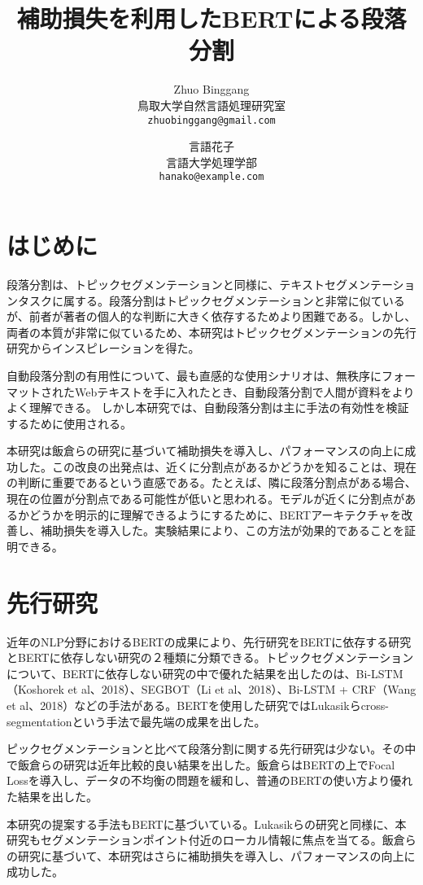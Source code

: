 \documentclass[
  platex, dvipdfmx,  %
]{nlp2021}
\title{補助損失を利用したBERTによる段落分割}
\author{%
  Zhuo Binggang \\ 鳥取大学自然言語処理研究室 \\ \texttt{zhuobinggang@gmail.com}\and
  言語花子 \\ 言語大学処理学部 \\ \texttt{hanako@example.com}}
\begin{document}
\maketitle

\section{はじめに}
段落分割は、トピックセグメンテーションと同様に、テキストセグメンテーションタスクに属する。段落分割はトピックセグメンテーションと非常に似ているが、前者が著者の個人的な判断に大きく依存するためより困難である。しかし、両者の本質が非常に似ているため、本研究はトピックセグメンテーションの先行研究からインスピレーションを得た。

自動段落分割の有用性について、最も直感的な使用シナリオは、無秩序にフォーマットされたWebテキストを手に入れたとき、自動段落分割で人間が資料をよりよく理解できる。 しかし本研究では、自動段落分割は主に手法の有効性を検証するために使用される。

本研究は飯倉らの研究に基づいて補助損失を導入し、パフォーマンスの向上に成功した。この改良の出発点は、近くに分割点があるかどうかを知ることは、現在の判断に重要であるという直感である。たとえば、隣に段落分割点がある場合、現在の位置が分割点である可能性が低いと思われる。モデルが近くに分割点があるかどうかを明示的に理解できるようにするために、BERTアーキテクチャを改善し、補助損失を導入した。実験結果により、この方法が効果的であることを証明できる。

\section{先行研究}

近年のNLP分野におけるBERTの成果により、先行研究をBERTに依存する研究とBERTに依存しない研究の２種類に分類できる。トピックセグメンテーションについて、BERTに依存しない研究の中で優れた結果を出したのは、Bi-LSTM（Koshorek et al、2018）、SEGBOT（Li et al、2018）、Bi-LSTM + CRF（Wang et al、2018）などの手法がある。BERTを使用した研究ではLukasikらcross-segmentationという手法で最先端の成果を出した。

ピックセグメンテーションと比べて段落分割に関する先行研究は少ない。その中で飯倉らの研究は近年比較的良い結果を出した。飯倉らはBERTの上でFocal Lossを導入し、データの不均衡の問題を緩和し、普通のBERTの使い方より優れた結果を出した。

本研究の提案する手法もBERTに基づいている。Lukasikらの研究と同様に、本研究もセグメンテーションポイント付近のローカル情報に焦点を当てる。飯倉らの研究に基づいて、本研究はさらに補助損失を導入し、パフォーマンスの向上に成功した。
\end{document}
